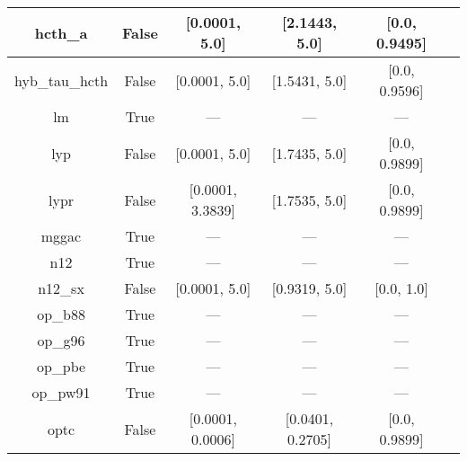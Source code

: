 \begin{tabular}{|c|c|c|c|c|l|}
       hcth\_a &                 False &    [0.0001, 5.0] &    [2.1443, 5.0] &  [0.0, 0.9495] &                                      \cite{Hamprecht1998_6264} \\ \hline
hyb\_tau\_hcth &                 False &    [0.0001, 5.0] &    [1.5431, 5.0] &  [0.0, 0.9596] &                                          \cite{Boese2002_9559} \\ \hline
            lm &                  True &              --- &              --- &            --- &                             \cite{Langreth1981_446,Hu1985_391} \\ \hline
           lyp &                 False &    [0.0001, 5.0] &    [1.7435, 5.0] &  [0.0, 0.9899] &                            \cite{Lee1988_785,Miehlich1989_200} \\ \hline
          lypr &                 False & [0.0001, 3.3839] &    [1.7535, 5.0] &  [0.0, 0.9899] &                                             \cite{Ai2021_1207} \\ \hline
         mggac &                  True &              --- &              --- &            --- &                                        \cite{Patra2019_155140} \\ \hline
           n12 &                  True &              --- &              --- &            --- &                                       \cite{Peverati2012_2310} \\ \hline
       n12\_sx &                 False &    [0.0001, 5.0] &    [0.9319, 5.0] &     [0.0, 1.0] &                                      \cite{Peverati2012_16187} \\ \hline
       op\_b88 &                  True &              --- &              --- &            --- &                                       \cite{Tsuneda1999_10664} \\ \hline
       op\_g96 &                  True &              --- &              --- &            --- &                      \cite{Tsuneda1999_10664,Tsuneda1999_5656} \\ \hline
       op\_pbe &                  True &              --- &              --- &            --- &                      \cite{Tsuneda1999_10664,Tsuneda1999_5656} \\ \hline
      op\_pw91 &                  True &              --- &              --- &            --- &                      \cite{Tsuneda1999_10664,Tsuneda1999_5656} \\ \hline
          optc &                 False & [0.0001, 0.0006] & [0.0401, 0.2705] &  [0.0, 0.9899] &                                           \cite{Cohen2001_607} \\ \hline

\end{tabular}
